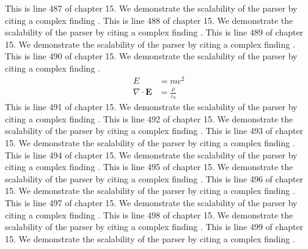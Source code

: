 This is line 487 of chapter 15. We demonstrate the scalability of the parser by citing a complex finding \cite{ref15_487}.
This is line 488 of chapter 15. We demonstrate the scalability of the parser by citing a complex finding \cite{ref15_488}.
This is line 489 of chapter 15. We demonstrate the scalability of the parser by citing a complex finding \cite{ref15_489}.
This is line 490 of chapter 15. We demonstrate the scalability of the parser by citing a complex finding \cite{ref15_490}.
\begin{align*}
  E &= mc^2 \\
  \nabla \cdot \mathbf{E} &= \frac{\rho}{\varepsilon_0}
\end{align*}
This is line 491 of chapter 15. We demonstrate the scalability of the parser by citing a complex finding \cite{ref15_491}.
This is line 492 of chapter 15. We demonstrate the scalability of the parser by citing a complex finding \cite{ref15_492}.
This is line 493 of chapter 15. We demonstrate the scalability of the parser by citing a complex finding \cite{ref15_493}.
This is line 494 of chapter 15. We demonstrate the scalability of the parser by citing a complex finding \cite{ref15_494}.
This is line 495 of chapter 15. We demonstrate the scalability of the parser by citing a complex finding \cite{ref15_495}.
This is line 496 of chapter 15. We demonstrate the scalability of the parser by citing a complex finding \cite{ref15_496}.
This is line 497 of chapter 15. We demonstrate the scalability of the parser by citing a complex finding \cite{ref15_497}.
This is line 498 of chapter 15. We demonstrate the scalability of the parser by citing a complex finding \cite{ref15_498}.
This is line 499 of chapter 15. We demonstrate the scalability of the parser by citing a complex finding \cite{ref15_499}.
